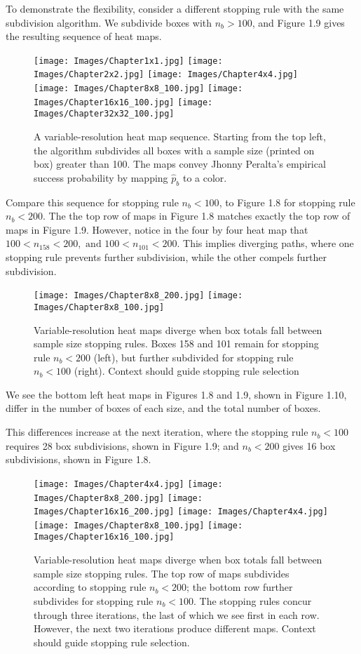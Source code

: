To demonstrate the flexibility, consider a different stopping rule with the same subdivision algorithm. We subdivide boxes with $n_{b} > 100$, and Figure 1.9 gives the resulting sequence of heat maps.
        \begin{figure}[H]
      	\centering
      	\texttt{[image: Images/Chapter1x1.jpg]}
      	\texttt{[image: Images/Chapter2x2.jpg]}
      	\texttt{[image: Images/Chapter4x4.jpg]}
      	\texttt{[image: Images/Chapter8x8\_100.jpg]}
      	\texttt{[image: Images/Chapter16x16\_100.jpg]}
      	\texttt{[image: Images/Chapter32x32\_100.jpg]}
      	\caption{A variable-resolution heat map sequence. Starting from the top left, the algorithm subdivides all boxes with a sample size (printed on box) greater than 100. The maps convey Jhonny Peralta's empirical success probability by mapping $\hat{p}_{b}$ to a color.}
\end{figure} 	
Compare this sequence for stopping rule $n_{b} < 100$, to Figure 1.8 for stopping rule $n_{b} < 200$. The the top row of maps in Figure 1.8 matches exactly the top row of maps in Figure 1.9. However, notice in the four by four heat map that $100 < n_{158} < 200, \text{ and } 100 < n_{101} < 200$. This implies diverging paths, where one stopping rule prevents further subdivision, while the other compels further subdivision.
        \begin{figure}[H]
      	\centering      
      	\texttt{[image: Images/Chapter8x8\_200.jpg]}
      	\texttt{[image: Images/Chapter8x8\_100.jpg]}
      	\caption{Variable-resolution heat maps diverge when box totals fall between sample size stopping rules. Boxes 158 and 101 remain for stopping rule $n_{b} < 200$ (left), but further subdivided for stopping rule $n_{b} < 100$ (right). Context should guide stopping rule selection}
\end{figure} 
We see the bottom left heat maps in Figures 1.8 and 1.9, shown in Figure 1.10, differ in the number of boxes of each size, and the total number of boxes. 

This differences increase at the next iteration, where the stopping rule $n_{b} < 100$ requires 28 box subdivisions, shown in Figure 1.9; and $n_{b} < 200$ gives 16 box subdivisions, shown in Figure 1.8.
        \begin{figure}[H]
      	\centering      
      	\texttt{[image: Images/Chapter4x4.jpg]}
      	\texttt{[image: Images/Chapter8x8\_200.jpg]}
      	\texttt{[image: Images/Chapter16x16\_200.jpg]}
      	\texttt{[image: Images/Chapter4x4.jpg]}
      	\texttt{[image: Images/Chapter8x8\_100.jpg]}
      	\texttt{[image: Images/Chapter16x16\_100.jpg]}
      	\caption{Variable-resolution heat maps diverge when box totals fall between sample size stopping rules. The top row of maps subdivides according to stopping rule $n_{b} < 200$; the bottom row further subdivides for stopping rule $n_{b} < 100$. The stopping rules concur through three iterations, the last of which we see first in each row. However, the next two iterations produce different maps. Context should guide stopping rule selection.}
\end{figure}

